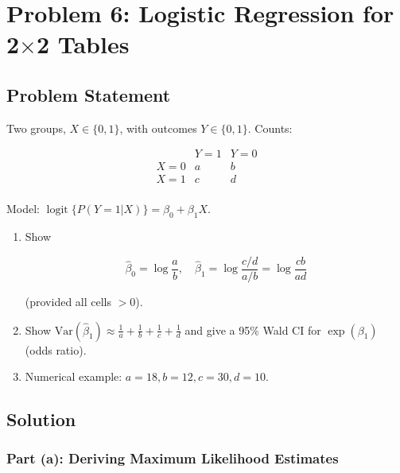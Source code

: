 \documentclass[12pt]{article}
\DeclareMathOperator{\logit}{logit}
\begin{document}
\newpage

\section{Problem 6: Logistic Regression for 2$\times$2 Tables}

\subsection{Problem Statement}

Two groups, \(X \in \{0,1\}\), with outcomes \(Y \in \{0,1\}\). Counts:

\[\begin{array}{c|cc}
& Y = 1 & Y = 0 \\
\hline
X = 0 & a & b \\
X = 1 & c & d \\
\end{array}\]

Model: \(\logit\{P(Y = 1 | X)\} = \beta_0 + \beta_1 X\).

\begin{enumerate}
\item[(a)] Show

\[\hat{\beta}_0 = \log \frac{a}{b}, \quad \hat{\beta}_1 = \log \frac{c/d}{a/b} = \log \frac{cb}{ad}\]

(provided all cells $> 0$).

\item[(b)] Show \(\text{Var}(\hat{\beta}_1) \approx \frac{1}{a} + \frac{1}{b} + \frac{1}{c} + \frac{1}{d}\) and give a 95\% Wald CI for \(\exp(\beta_1)\) (odds ratio).

\item[(c)] Numerical example: \(a = 18, b = 12, c = 30, d = 10\).
\end{enumerate}

\subsection{Solution}

\subsubsection{Part (a): Deriving Maximum Likelihood Estimates}
\end{document}

